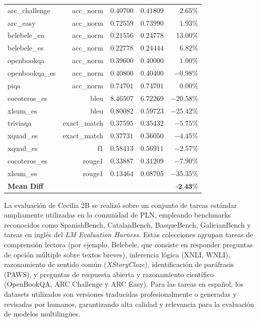 \documentclass[10pt,twoside]{rcmart} %
\begin{document}
\begin{table}[hbt]
\begin{center}
\begin{tabular}{lrrrr}
arc\_challenge      & acc\_norm     & $0.40700$   & $0.41809$  & $2.65$\%    		 \\
arc\_easy           & acc\_norm     & $0.72559$   & $0.73990$  & $1.93$\%    		 \\
belebele\_en        & acc\_norm     & $0.21556$   & $0.24778$  & $13.00$\%   		 \\
belebele\_es        & acc\_norm     & $0.22778$   & $0.24444$  & $6.82$\%    		 \\
openbookqa          & acc\_norm     & $0.39600$   & $0.40000$  & $1.00$\%    		 \\
openbookqa\_es      & acc\_norm     & $0.40800$   & $0.40400$  & $-0.98$\%   		 \\
piqa                & acc\_norm     & $0.74701$   & $0.74701$  & $0.00$\%    		 \\
cocoteros\_es       & bleu          & $8.46507$   & $6.72269$  & $-20.58$\%  		 \\
xlsum\_es           & bleu          & $0.80082$   & $0.59723$  & $-25.42$\%  		 \\
triviaqa            & exact\_match  & $0.37595$   & $0.35432$  & $-5.75$\%   		 \\
xquad\_es           & exact\_match  & $0.37731$   & $0.36050$  & $-4.45$\%   		 \\
xquad\_es           & f1            & $0.58413$   & $0.56911$  & $-2.57$\%   		 \\
cocoteros\_es       & rouge1        & $0.33887$   & $0.31209$  & $-7.90$\%   		 \\
xlsum\_es           & rouge1        & $0.13464$   & $0.08705$  & $-35.35$\%  		 \\
\textbf{Mean Diff}  &               &             &            & $\textbf{-2.43}$\%  \\\hline\hline
\end{tabular}
\end{center}
\label{tab:eval}
\end{table}

La evaluación de Cecilia 2B se realizó sobre un conjunto de tareas estándar ampliamente utilizadas en la comunidad de PLN, empleando benchmarks reconocidos como SpanishBench, CatalanBench, BasqueBench, GalicianBench y tareas en inglés del \textit{LM Evaluation Harness}. Estas colecciones agrupan tareas de comprensión lectora (por ejemplo, Belebele, que consiste en responder preguntas de opción múltiple sobre textos breves), inferencia lógica (XNLI, WNLI), razonamiento de sentido común (\textit{XStoryCloze}), identificación de paráfrasis (PAWS), y preguntas de respuesta abierta y razonamiento científico (OpenBookQA, ARC Challenge y ARC Easy). Para las tareas en español, los datasets utilizados son versiones traducidas profesionalmente o generadas y revisadas por humanos, garantizando alta calidad y relevancia para la evaluación de modelos multilingües.
\end{document}
